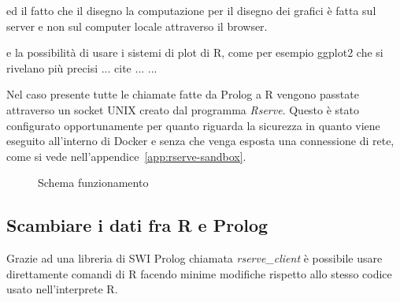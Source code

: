 \documentclass[10pt,titlepage,twoside,a4paper]{report}
\begin{document}
ed il 
fatto che il disegno 
la computazione per il disegno dei grafici è fatta sul server e non sul 
computer locale attraverso il browser.
 
e la possibilità di usare i sistemi di plot di R, come per esempio ggplot2 
che si rivelano più precisi ... cite ... ...

Nel caso presente tutte le chiamate fatte da Prolog a R vengono passtate 
attraverso un socket UNIX creato dal programma \emph{Rserve}\cite{rserve}. 
Questo è stato configurato opportunamente per quanto riguarda la sicurezza 
in quanto viene eseguito all'interno di Docker e senza che venga esposta una 
connessione di rete, come si vede nell'appendice~\ref{app:rserve-sandbox}.

\begin{figure}[H]
\centering
\caption{Schema funzionamento}
\end{figure}

\subsection{Scambiare i dati fra R e Prolog}
Grazie ad una libreria di SWI Prolog chiamata 
\emph{rserve\_client}\cite{rserveclient} 
è possibile usare direttamente comandi di R facendo minime modifiche 
rispetto allo stesso codice usato nell'interprete R.
\end{document}
